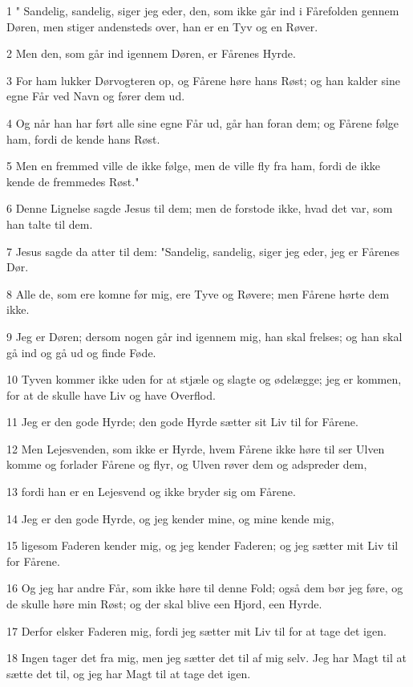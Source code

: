 \par 1 " Sandelig, sandelig, siger jeg eder, den, som ikke går ind i Fårefolden gennem Døren, men stiger andensteds over, han er en Tyv og en Røver.
\par 2 Men den, som går ind igennem Døren, er Fårenes Hyrde.
\par 3 For ham lukker Dørvogteren op, og Fårene høre hans Røst; og han kalder sine egne Får ved Navn og fører dem ud.
\par 4 Og når han har ført alle sine egne Får ud, går han foran dem; og Fårene følge ham, fordi de kende hans Røst.
\par 5 Men en fremmed ville de ikke følge, men de ville fly fra ham, fordi de ikke kende de fremmedes Røst."
\par 6 Denne Lignelse sagde Jesus til dem; men de forstode ikke, hvad det var, som han talte til dem.
\par 7 Jesus sagde da atter til dem: "Sandelig, sandelig, siger jeg eder, jeg er Fårenes Dør.
\par 8 Alle de, som ere komne før mig, ere Tyve og Røvere; men Fårene hørte dem ikke.
\par 9 Jeg er Døren; dersom nogen går ind igennem mig, han skal frelses; og han skal gå ind og gå ud og finde Føde.
\par 10 Tyven kommer ikke uden for at stjæle og slagte og ødelægge; jeg er kommen, for at de skulle have Liv og have Overflod.
\par 11 Jeg er den gode Hyrde; den gode Hyrde sætter sit Liv til for Fårene.
\par 12 Men Lejesvenden, som ikke er Hyrde, hvem Fårene ikke høre til ser Ulven komme og forlader Fårene og flyr, og Ulven røver dem og adspreder dem,
\par 13 fordi han er en Lejesvend og ikke bryder sig om Fårene.
\par 14 Jeg er den gode Hyrde, og jeg kender mine, og mine kende mig,
\par 15 ligesom Faderen kender mig, og jeg kender Faderen; og jeg sætter mit Liv til for Fårene.
\par 16 Og jeg har andre Får, som ikke høre til denne Fold; også dem bør jeg føre, og de skulle høre min Røst; og der skal blive een Hjord, een Hyrde.
\par 17 Derfor elsker Faderen mig, fordi jeg sætter mit Liv til for at tage det igen.
\par 18 Ingen tager det fra mig, men jeg sætter det til af mig selv. Jeg har Magt til at sætte det til, og jeg har Magt til at tage det igen.
